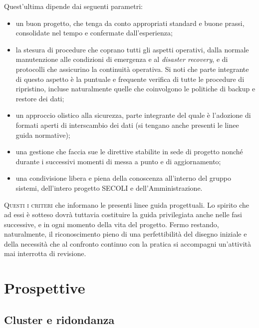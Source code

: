 \documentclass[headinclude,footinclude,a4paper,11pt,final]{scrreprt}
\begin{document}
Quest'ultima dipende dai seguenti parametri:
\begin{itemize}
\item un buon progetto, che tenga da conto appropriati standard e buone prassi, consolidate nel tempo e confermate dall'esperienza;
\item la stesura di procedure che coprano tutti gli aspetti operativi, dalla normale manutenzione alle condizioni di emergenza e al \emph{disaster recovery}, e di protocolli che assicurino la continuità operativa.  Si noti che parte integrante di questo aspetto è la puntuale e frequente verifica di tutte le procedure di ripristino, incluse naturalmente quelle che coinvolgono le politiche di backup e restore dei dati;
\item un approccio olistico alla sicurezza, parte integrante del quale è l'adozione di formati aperti di interscambio dei dati (si tengano anche presenti le linee guida normative);
\item una gestione che faccia sue le direttive stabilite in sede di progetto nonché durante i successivi momenti di messa a punto e di aggiornamento;
\item una condivisione libera e piena della conoscenza all'interno del gruppo sistemi, dell'intero progetto SECOLI e dell'Am\-mi\-ni\-stra\-zione.
\end{itemize}

\bigskip

\lettrine{Q}{uesti i criteri} che informano le presenti linee guida progettuali.  Lo spirito che ad essi è sotteso dovrà tuttavia costituire la guida privilegiata anche nelle fasi successive, e in ogni momento della vita del progetto. Fermo restando, naturalmente, il riconoscimento pieno di una perfettibilità del disegno iniziale e della necessità che al confronto continuo con la pratica si accompagni un'attività mai interrotta di revisione.



\chapter{Prospettive}

\section{Cluster e ridondanza}
\end{document}
